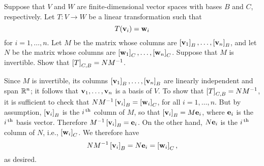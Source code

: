 \begin{ex}
  Suppose that $V$ and $W$ are finite-dimensional vector spaces with
  bases $B$ and $C$, respectively. Let $T:V\to W$ be a linear
  transformation such that
  \begin{equation*}
    T(\vect{v}_i)=\vect{w}_i
  \end{equation*}
  for $i=1,\ldots,n$. Let $M$ be the matrix whose columns are
  $\coord{\vect{v}_1}_B,\ldots,\coord{\vect{v}_n}_B$, and let $N$ be
  the matrix whose columns are
  $\coord{\vect{w}_1}_C,\ldots,\coord{\vect{w}_n}_C$.  Suppose that
  $M$ is invertible. Show that $\left[T\right]_{C,B} = NM^{-1}$. 
  \begin{sol}
    Since $M$ is invertible, its columns
    $\coord{\vect{v}_1}_B,\ldots,\coord{\vect{v}_n}_B$ are linearly
    independent and span $\mathbb{R}^n$; it follows that
    $\vect{v}_1,\ldots,\vect{v}_n$ is a basis of $V$. To show that
    $\left[T\right]_{C,B} = NM^{-1}$, it is sufficient to check that
    $NM^{-1}\coord{\vect{v}_i}_B = \coord{\vect{w}_i}_C$, for all
    $i=1,\ldots,n$. But by assumption, $\coord{\vect{v}_i}_B$ is the
    $i^{\,\rm th}$ column of $M$, so that $\coord{\vect{v}_i}_B =
    M\vect{e}_i$, where $\vect{e}_i$ is the $i^{\,\rm th}$ basis
    vector. Therefore $M^{-1}\coord{\vect{v}_i}_B  = \vect{e}_i$.
    On the other hand, $N\vect{e}_i$ is the $i^{\,\rm th}$ column of $N$,
    i.e., $\coord{\vect{w}_i}_C$. We therefore have
    \begin{equation*}
      NM^{-1}\coord{\vect{v}_i}_B = N\vect{e}_i = \coord{\vect{w}_i}_C,
    \end{equation*}
    as desired.
  \end{sol}
\end{ex}

